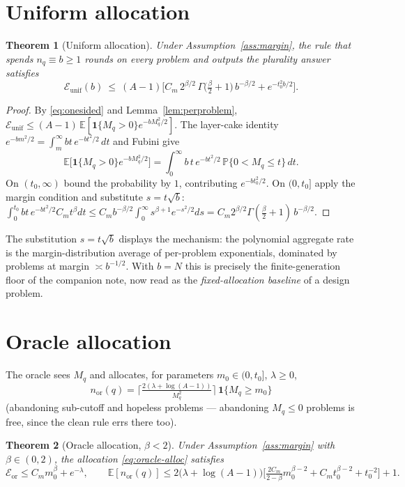 \documentclass[11pt]{article}
\newtheorem{theorem}{Theorem}
\newcommand{\E}{\mathbb E}
\newcommand{\Pp}{\mathbb P}
\newcommand{\one}{\mathbf 1}
\begin{document}
\section{Uniform allocation}

\begin{theorem}[Uniform allocation]
\label{thm:uniform}
Under Assumption~\ref{ass:margin}, the rule that spends $n_q\equiv b\ge1$
rounds on every problem and outputs the plurality answer satisfies
\[
\mathcal E_{\mathrm{unif}}(b)
\ \le\
(A-1)\Big[
C_m\,2^{\beta/2}\,\Gamma\big(\tfrac\beta2+1\big)\,b^{-\beta/2}
+e^{-t_0^2b/2}
\Big].
\]
\end{theorem}

\begin{proof}
By \eqref{eq:onesided} and Lemma~\ref{lem:perproblem},
$\mathcal E_{\mathrm{unif}}\le(A-1)\,\E[\one\{M_q>0\}e^{-bM_q^2/2}]$.  The
layer-cake identity $e^{-bm^2/2}=\int_m^\infty bt\,e^{-bt^2/2}\,dt$ and
Fubini give
\[
\E\big[\one\{M_q>0\}e^{-bM_q^2/2}\big]
=\int_0^\infty b\,t\,e^{-bt^2/2}\,\Pp\{0<M_q\le t\}\,dt .
\]
On $(t_0,\infty)$ bound the probability by $1$, contributing
$e^{-bt_0^2/2}$.  On $(0,t_0]$ apply the margin condition and substitute
$s=t\sqrt b$:
$\int_0^{t_0}bt\,e^{-bt^2/2}C_mt^\beta dt
\le C_m b^{-\beta/2}\int_0^\infty s^{\beta+1}e^{-s^2/2}ds
=C_m2^{\beta/2}\Gamma(\tfrac\beta2+1)\,b^{-\beta/2}$.
\end{proof}

The substitution $s=t\sqrt b$ displays the mechanism: the polynomial
aggregate rate is the margin-distribution average of per-problem
exponentials, dominated by problems at margin $\asymp b^{-1/2}$.  With
$b=N$ this is precisely the finite-generation floor of the companion note,
now read as the \emph{fixed-allocation baseline} of a design problem.

\section{Oracle allocation}

The oracle sees $M_q$ and allocates, for parameters $m_0\in(0,t_0]$,
$\lambda\ge0$,
\begin{equation}
\label{eq:oracle-alloc}
n_{\mathrm{or}}(q)
=
\Big\lceil \tfrac{2(\lambda+\log(A-1))}{M_q^2}\Big\rceil
\,\one\{M_q\ge m_0\}
\end{equation}
(abandoning sub-cutoff and hopeless problems --- abandoning $M_q\le0$
problems is free, since the clean rule errs there too).

\begin{theorem}[Oracle allocation, $\beta<2$]
\label{thm:oracle}
Under Assumption~\ref{ass:margin} with $\beta\in(0,2)$, the allocation
\eqref{eq:oracle-alloc} satisfies
\[
\mathcal E_{\mathrm{or}}
\le
C_m m_0^\beta+e^{-\lambda},
\qquad
\E[n_{\mathrm{or}}(q)]
\le
2\big(\lambda+\log(A-1)\big)
\Big[\tfrac{2C_m}{2-\beta}m_0^{\beta-2}+C_mt_0^{\beta-2}+t_0^{-2}\Big]+1 .
\]
\end{theorem}
\end{document}
